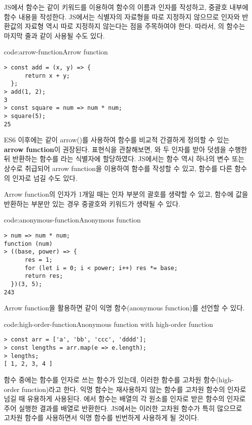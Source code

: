 JS에서 함수는 \과 같이  키워드를 이용하여 함수의 이름과 인자를 작성하고, 중괄호 내부에 함수 내용을 작성한다. JS에서는 식별자의 자료형을 따로 지정하지 않으므로 인자와 반환값의 자료형 역시 따로 지정하지 않는다는 점을 주목하여야 한다. 따라서, 의 함수는 마지막 줄과 같이 사용될 수도 있다.

\begin{code}{code:arrow-function}{Arrow function}
\begin{verbatim}
> const add = (x, y) => {
      return x + y;
  };
> add(1, 2);
3
> const square = num => num * num;
> square(5);
25
\end{verbatim}
\end{code}

ES6 이후에는 \과 같이 arrow(\cd{=>})를 사용하여 함수를 비교적 간결하게 정의할 수 있는 \textbf{arrow function}이 권장된다. 표현식을 관찰해보면, 와  두 인자를 받아 덧셈을 수행한 뒤 반환하는 함수를 라는 식별자에 할당하였다. JS에서는 함수 역시 하나의 변수 또는 상수로 취급되어 arrow function을 이용하여 함수를 작성할 수 있고, 함수를 다른 함수의 인자로 넘길 수도 있다.

Arrow function의 인자가 1개일 때는 인자 부분의 괄호를 생략할 수 있고, 함수에 값을 반환하는 부분만 있는 경우 중괄호와  키워드가 생략될 수 있다.

\begin{code}{code:anonymous-function}{Anonymous function}
\begin{verbatim}
> num => num * num;
function (num)
> ((base, power) => {
      res = 1;
      for (let i = 0; i < power; i++) res *= base;
      return res;
  })(3, 5);
243
\end{verbatim}
\end{code}

Arrow function을 활용하면 \과 같이 익명 함수(anonymous function)를 선언할 수 있다.

\begin{code}{code:high-order-function}{Anonymous function with high-order function}
\begin{verbatim}
> const arr = ['a', 'bb', 'ccc', 'dddd'];
> const lengths = arr.map(e => e.length);
> lengths;
[ 1, 2, 3, 4 ]
\end{verbatim}
\end{code}

함수 중에는 함수를 인자로 쓰는 함수가 있는데, 이러한 함수를 고차원 함수(high-order function)라고 한다. 익명 함수는 재사용하지 않는 함수를 고차원 함수의 인자로 넘길 때 유용하게 사용된다. 에서  함수는 배열의 각 원소를 인자로 받은 함수의 인자로 주어 실행한 결과를 배열로 반환한다. JS에서는 이러한 고차원 함수가 특히 많으므로 고차원 함수를 사용하면서 익명 함수를 빈번하게 사용하게 될 것이다.

